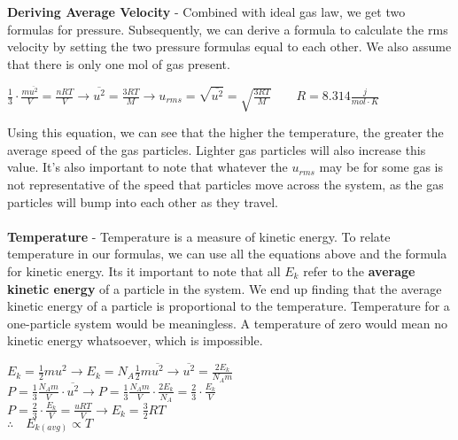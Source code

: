 \documentclass{article}
\begin{document}
\noindent\textbf{Deriving Average Velocity} - Combined with ideal gas law, we get two formulas for pressure. Subsequently, we can derive a formula to calculate the rms velocity by setting the two pressure formulas equal to each other. We also assume that there is only one mol of gas present.
\begin{qq}

	\begin{center}
		$\frac{1}{3}\cdot\frac{m\overline{u^2}}{V}=\frac{nRT}{V} \longrightarrow \overline{u^2}=\frac{3RT}{M}\longrightarrow u_{rms}=\sqrt{\overline{u^2}}=\sqrt{\frac{3RT}{M}} \qquad R=8.314\frac{j}{mol\cdot K}$
	\end{center}

\end{qq}

\vspace{3pt}
\noindent Using this equation, we can see that the higher the temperature, the greater the average speed of the gas particles. Lighter gas particles will also increase this value. It's also important to note that whatever the $u_{rms}$ may be for some gas is not representative of the speed that particles move across the system, as the gas particles will bump into each other as they travel.\\
\\
\textbf{Temperature} - Temperature is a measure of kinetic energy. To relate temperature in our formulas, we can use all the equations above and the formula for kinetic energy. Its it important to note that all $E_k$ refer to the \textbf{average kinetic energy} of a particle in the system. We end up finding that the average kinetic energy of a particle is proportional to the temperature. Temperature for a one-particle system would be meaningless. A temperature of zero would mean no kinetic energy whatsoever, which is impossible.
\begin{qq}

	\begin{center}
		$E_k=\frac{1}{2}mu^2\longrightarrow E_k=N_A\frac{1}{2}m\overline{u^2}\longrightarrow \overline{u^2}=\frac{2E_k}{N_Am}$\\
		\vspace{5pt}
		$P=\frac{1}{3}\frac{N_Am}{V}\cdot\overline{u^2}\longrightarrow P=\frac{1}{3}\frac{N_Am}{V}\cdot\frac{2E_k}{N_A}=\frac{2}{3}\cdot\frac{E_k}{V}$\\
		\vspace{5pt}
		$P=\frac{2}{3}\cdot\frac{E_k}{V}=\frac{uRT}{V}\longrightarrow E_k=\frac{3}{2}RT$\\
		\vspace{5pt}
		$\therefore \quad E_{k(avg)}\propto T$
	\end{center}

\end{qq}
\pagebreak
\end{document}
